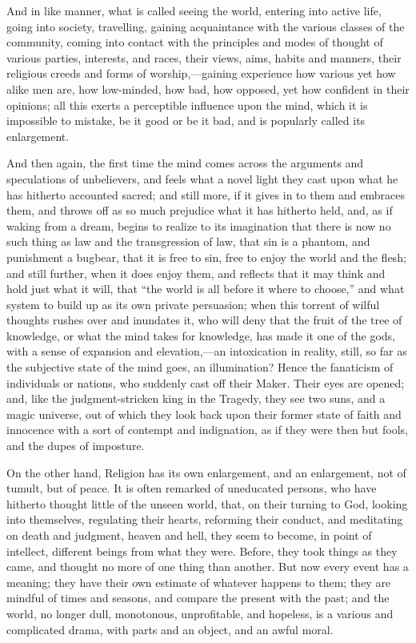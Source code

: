 And in like manner, what is called seeing the world, entering into
active life, going into society, travelling, gaining acquaintance with
the various classes of the community, coming into contact with the
principles and modes of thought of various parties, interests, and
races, their views, aims, habits and manners, their religious creeds
and forms of worship,—gaining experience how various yet how alike
men are, how low-minded, how bad, how opposed, yet how confident in
their opinions; all this exerts a perceptible influence upon the mind,
which it is impossible to mistake, be it good or be it bad, and is
popularly called its enlargement.

And then again, the first time the mind comes across the arguments
and speculations of unbelievers, and feels what a novel light they
cast upon what he has hitherto accounted sacred; and still more, if it
gives in to them and embraces them, and throws off as so much
prejudice what it has hitherto held, and, as if waking from a dream,
begins to realize to its imagination that there is now no such thing
as law and the transgression of law, that sin is a phantom, and
punishment a bugbear, that it is free to sin, free to enjoy the world
and the flesh; and still further, when it does enjoy them, and
reflects that it may think and hold just what it will, that ``the
world is all before it where to choose,'' and what system to build
up as its own private persuasion; when this torrent of wilful thoughts
rushes over and inundates it, who will deny that the fruit of
the tree of knowledge, or what the mind takes for knowledge, has made
it one of the gods, with a sense of expansion and elevation,—an
intoxication in reality, still, so far as the subjective state of the
mind goes, an illumination? Hence the fanaticism of individuals or
nations, who suddenly cast off their Maker. Their eyes are opened;
and, like the judgment-stricken king in the Tragedy, they see two
suns, and a magic universe, out of which they look back upon their
former state of faith and innocence with a sort of contempt and
indignation, as if they were then but fools, and the dupes of
imposture.

On the other hand, Religion has its own enlargement, and an
enlargement, not of tumult, but of peace. It is often remarked of
uneducated persons, who have hitherto thought little of the unseen
world, that, on their turning to God, looking into themselves,
regulating their hearts, reforming their conduct, and meditating on
death and judgment, heaven and hell, they seem to become, in point of
intellect, different beings from what they were. Before, they took
things as they came, and thought no more of one thing than another.
But now every event has a meaning; they have their own estimate of
whatever happens to them; they are mindful of times and seasons, and
compare the present with the past; and the world, no longer dull,
monotonous, unprofitable, and hopeless, is a various and complicated
drama, with parts and an object, and an awful moral.

